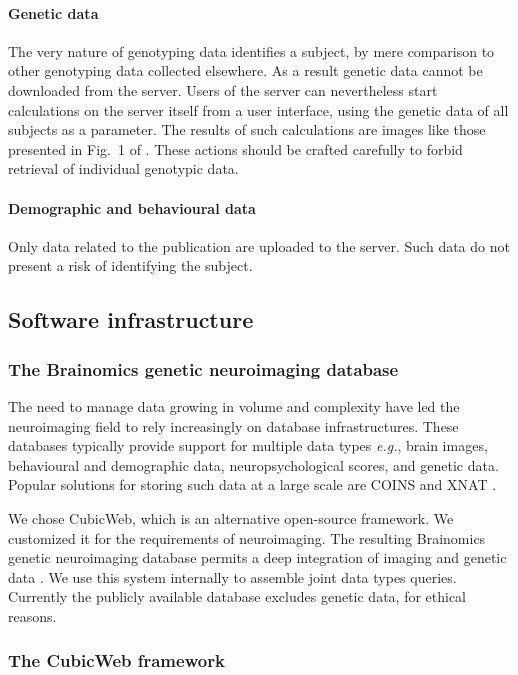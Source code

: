 \documentclass[review]{elsarticle}
\begin{document}
\paragraph{Genetic data} The very nature of genotyping data identifies a subject, by mere comparison to other genotyping data collected elsewhere. As a result genetic data cannot be downloaded from the server. Users of the server can nevertheless start calculations on the server itself from a user interface, using the genetic data of all subjects as a parameter. The results of such calculations are images like those presented in Fig.~1 of \cite{Pinel2012}. These actions should be crafted carefully to forbid retrieval of individual genotypic data.

\paragraph{Demographic and behavioural data} Only data related to the publication \cite{Pinel2007} are uploaded to the server. Such data do not present a risk of identifying the subject.


\subsection{Software infrastructure}

\subsubsection{The Brainomics genetic neuroimaging database}

The need to manage data growing in volume and complexity have led the neuroimaging field to rely increasingly on database infrastructures. These databases typically provide support for multiple data types \textit{e.g.}, brain images, behavioural and demographic data, neuropsychological scores, and genetic data. Popular solutions for storing such data at a large scale are COINS \cite{COINS2011} and XNAT \cite{XNAT2007}.

We chose CubicWeb, which is an alternative open-source framework. We customized it for the requirements of neuroimaging. The resulting Brainomics genetic neuroimaging database permits a deep integration of imaging and genetic data \cite{HBM2013}. We use this system internally to assemble joint data types queries. Currently the publicly available database excludes genetic data, for ethical reasons.


\subsubsection{The CubicWeb framework}
\label{sec:cubicweb}
\end{document}
